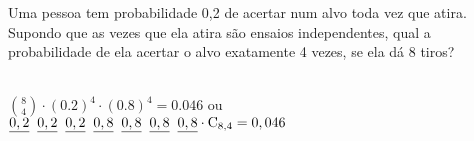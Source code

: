 \begin{ex}
 Uma pessoa tem probabilidade 0,2 de acertar num alvo toda vez que atira. Supondo que as vezes que ela atira são ensaios independentes, qual a probabilidade de ela acertar o alvo exatamente 4 vezes, se ela dá 8 tiros?
 \begin{sol}
     \phantom{A} \\
 $\binom{8}{4} \cdot (0.2)^4 \cdot (0.8)^4 = 0.046$ ou \\
 $ \underline{0,2}\hspace{0.2cm} \underline{0,2}\hspace{0.2cm} \underline{0,2}\hspace{0.2cm} \underline{0,8}\hspace{0.2cm} \underline{0,8}\hspace{0.2cm} \underline{0,8}\hspace{0.2cm} \underline{0,8}\cdot  \mathrm{C}_ {8,4} = 0,046 $
   \end{sol}
\end{ex}